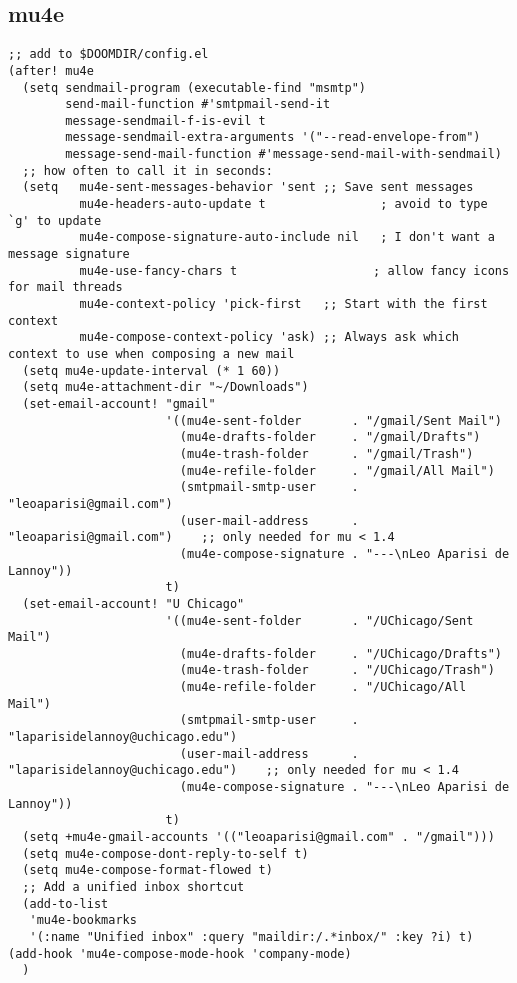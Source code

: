 \documentclass[c]{article}
\theoremstyle{plain}%
\theoremstyle{definition}
\theoremstyle{remark}
\begin{document}
\subsection{mu4e}
\label{sec:orgebdf852}
\begin{verbatim}
;; add to $DOOMDIR/config.el
(after! mu4e
  (setq sendmail-program (executable-find "msmtp")
        send-mail-function #'smtpmail-send-it
        message-sendmail-f-is-evil t
        message-sendmail-extra-arguments '("--read-envelope-from")
        message-send-mail-function #'message-send-mail-with-sendmail)
  ;; how often to call it in seconds:
  (setq   mu4e-sent-messages-behavior 'sent ;; Save sent messages
          mu4e-headers-auto-update t                ; avoid to type `g' to update
          mu4e-compose-signature-auto-include nil   ; I don't want a message signature
          mu4e-use-fancy-chars t                   ; allow fancy icons for mail threads
          mu4e-context-policy 'pick-first   ;; Start with the first context
          mu4e-compose-context-policy 'ask) ;; Always ask which context to use when composing a new mail
  (setq mu4e-update-interval (* 1 60))
  (setq mu4e-attachment-dir "~/Downloads")
  (set-email-account! "gmail"
                      '((mu4e-sent-folder       . "/gmail/Sent Mail")
                        (mu4e-drafts-folder     . "/gmail/Drafts")
                        (mu4e-trash-folder      . "/gmail/Trash")
                        (mu4e-refile-folder     . "/gmail/All Mail")
                        (smtpmail-smtp-user     . "leoaparisi@gmail.com")
                        (user-mail-address      . "leoaparisi@gmail.com")    ;; only needed for mu < 1.4
                        (mu4e-compose-signature . "---\nLeo Aparisi de Lannoy"))
                      t)
  (set-email-account! "U Chicago"
                      '((mu4e-sent-folder       . "/UChicago/Sent Mail")
                        (mu4e-drafts-folder     . "/UChicago/Drafts")
                        (mu4e-trash-folder      . "/UChicago/Trash")
                        (mu4e-refile-folder     . "/UChicago/All Mail")
                        (smtpmail-smtp-user     . "laparisidelannoy@uchicago.edu")
                        (user-mail-address      . "laparisidelannoy@uchicago.edu")    ;; only needed for mu < 1.4
                        (mu4e-compose-signature . "---\nLeo Aparisi de Lannoy"))
                      t)
  (setq +mu4e-gmail-accounts '(("leoaparisi@gmail.com" . "/gmail")))
  (setq mu4e-compose-dont-reply-to-self t)
  (setq mu4e-compose-format-flowed t)
  ;; Add a unified inbox shortcut
  (add-to-list
   'mu4e-bookmarks
   '(:name "Unified inbox" :query "maildir:/.*inbox/" :key ?i) t)
(add-hook 'mu4e-compose-mode-hook 'company-mode)
  )
\end{verbatim}
\end{document}
